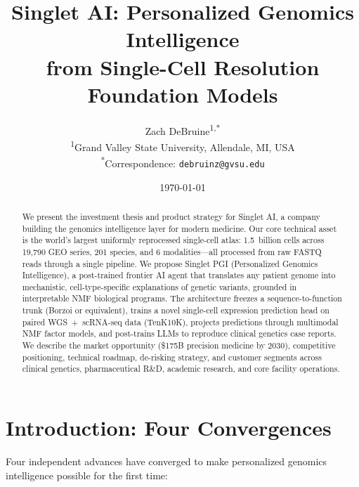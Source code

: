 \documentclass[10pt,twocolumn,letterpaper]{article}
\title{Singlet AI: Personalized Genomics Intelligence\\
  from Single-Cell Resolution Foundation Models}
\author{%
  Zach DeBruine\textsuperscript{1,*}\\[4pt]
  \textsuperscript{1}Grand Valley State University, Allendale, MI, USA\\
  \textsuperscript{*}Correspondence: \texttt{debruinz@gvsu.edu}
}
\date{\today}
\begin{document}
\maketitle

\begin{abstract}
We present the investment thesis and product strategy for Singlet AI, a company
building the genomics intelligence layer for modern medicine. Our core technical
asset is the world's largest uniformly reprocessed single-cell atlas: 1.5~billion
cells across 19,790 GEO series, 201 species, and 6 modalities---all processed
from raw FASTQ reads through a single pipeline. We propose Singlet PGI
(Personalized Genomics Intelligence), a post-trained frontier AI agent that
translates any patient genome into mechanistic, cell-type-specific explanations of
genetic variants, grounded in interpretable NMF biological programs. The
architecture freezes a sequence-to-function trunk (Borzoi or equivalent), trains a
novel single-cell expression prediction head on paired WGS~+~scRNA-seq data
(TenK10K), projects predictions through multimodal NMF factor models, and
post-trains LLMs to reproduce clinical genetics case reports. We describe the
market opportunity (\$175B precision medicine by 2030), competitive positioning,
technical roadmap, de-risking strategy, and customer segments across clinical
genetics, pharmaceutical R\&D, academic research, and core facility operations.
\end{abstract}

\section{Introduction: Four Convergences}
\label{sec:convergences}

Four independent advances have converged to make personalized genomics intelligence
possible for the first time:
\end{document}

